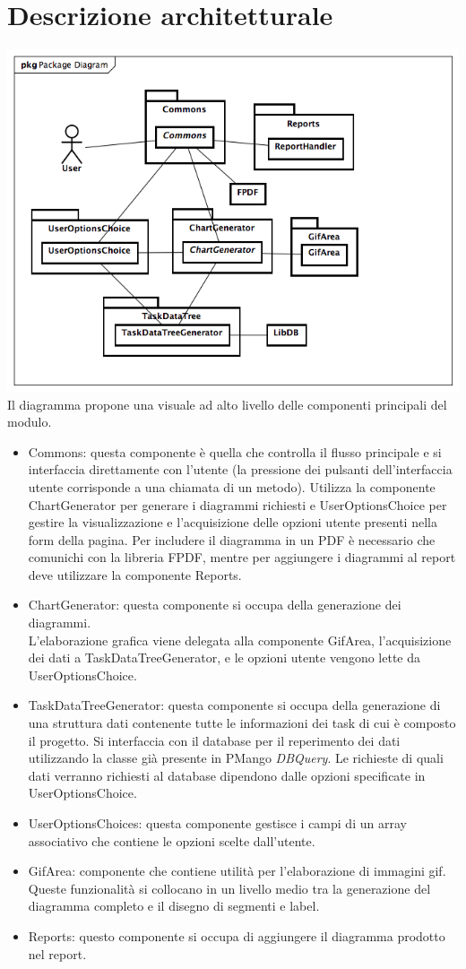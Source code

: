\documentclass[a4paper, 12pt]{report}
\begin{document}
\section{Descrizione architetturale}
\includegraphics[width=\textwidth]{chart/PackageDiagram.png}
Il diagramma propone una visuale ad alto livello delle componenti principali del modulo.
\begin{itemize}
	\item Commons: questa componente \`e quella che controlla il flusso principale e si interfaccia direttamente con l'utente (la pressione dei pulsanti dell'interfaccia utente corrisponde a una chiamata di un metodo). Utilizza la componente ChartGenerator per generare i diagrammi richiesti e UserOptionsChoice per gestire la visualizzazione e l'acquisizione delle opzioni utente presenti nella form della pagina. Per includere il diagramma in un PDF \`e necessario che comunichi con la libreria FPDF, mentre per aggiungere i diagrammi al report deve utilizzare la componente Reports.
	\item ChartGenerator: questa componente si occupa della generazione dei diagrammi. \\
L'elaborazione grafica viene delegata alla componente GifArea, l'acquisizione dei dati a TaskDataTreeGenerator, e le opzioni utente vengono lette da UserOptionsChoice.
	\item TaskDataTreeGenerator: questa componente si occupa della generazione di una struttura dati contenente tutte le informazioni dei task di cui \`e composto il progetto. Si interfaccia con il database per il reperimento dei dati utilizzando la classe gi\`a presente in PMango \emph{DBQuery}. Le richieste di quali dati verranno richiesti al database dipendono dalle opzioni specificate in UserOptionsChoice.
	\item UserOptionsChoices: questa componente gestisce i campi di un array associativo che contiene le opzioni scelte dall'utente.
	\item GifArea: componente che contiene utilit\`a per l'elaborazione di immagini gif. Queste funzionalit\`a si collocano in un livello medio tra la generazione del diagramma completo e il disegno di segmenti e label.
	\item Reports: questo componente si occupa di aggiungere il diagramma prodotto nel report.
\end{itemize}
\end{document}
